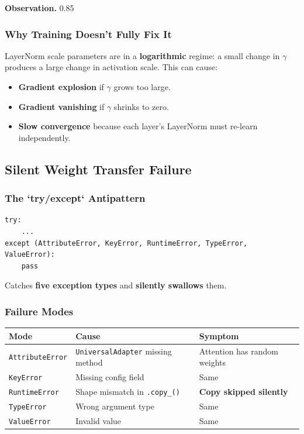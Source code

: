 \textbf{Observation.} 0.85

\subsubsection{Why Training Doesn't Fully Fix It}

LayerNorm scale parameters are in a \textbf{logarithmic} regime: a small change 
in $\gamma$ produces a large change in activation scale. This can cause:

\begin{itemize}
\item \textbf{Gradient explosion} if $\gamma$ grows too large.
\item \textbf{Gradient vanishing} if $\gamma$ shrinks to zero.
\item \textbf{Slow convergence} because each layer's LayerNorm must re-learn
  independently.

\end{itemize}
\subsection{Silent Weight Transfer Failure}

\subsubsection{The `try/except` Antipattern}

\begin{lstlisting}
try:
    ...
except (AttributeError, KeyError, RuntimeError, TypeError, ValueError):
    pass
\end{lstlisting}

Catches \textbf{five exception types} and \textbf{silently swallows} them.

\subsubsection{Failure Modes}

\begin{table}[H]
\centering
\small
\begin{tabular}{lll}
\toprule
\textbf{Mode} & \textbf{Cause} & \textbf{Symptom} \\
\midrule
\texttt{AttributeError} & \texttt{UniversalAdapter} missing method & Attention has random weights \\
\texttt{KeyError} & Missing config field & Same \\
\texttt{RuntimeError} & Shape mismatch in \texttt{.copy\_()} & \textbf{Copy skipped silently} \\
\texttt{TypeError} & Wrong argument type & Same \\
\texttt{ValueError} & Invalid value & Same \\
\bottomrule
\end{tabular}
\end{table}


